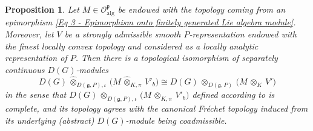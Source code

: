 \documentclass[a4paper, reqno, 10pt]{amsart}
\newtheorem{proposition}[theorem]{Proposition}
\theoremstyle{definition}
\numberwithin{equation}{section}
\newcommand{\botimes}[1]{{\,\otimes_{#1}\,}}
\newcommand{\cotimes}[1]{{\,\widehat{\otimes}_{#1}\,}}
\newcommand{\projotimes}{{\,\otimes_{K,\pi}\,}}
\newcommand{\projcotimes}{{\,\widehat{\otimes}_{K,\pi}\,}}
\newcommand{\CO}{{\mathcal {O}}}
\newcommand{\Fg}{{\mathfrak {g}}}
\newcommand{\Fp}{{\mathfrak {p}}}
\newcommand{\alg}{{\mathrm{alg}}}
\begin{document}
\begin{proposition}\label{Lemma 3 - Comparision between Orlik-Strauch functors and topological tensor product}
	Let $M \in \CO^\Fp_\alg$ be endowed with the topology coming from an epimorphism \eqref{Eq 3 - Epimorphism onto finitely generated Lie algebra module}.
	Moreover, let $V$ be a strongly admissible smooth $P$-representation endowed with the finest locally convex topology and considered as a locally analytic representation of $P$.
	Then there is a topological isomorphism of separately continuous $D(G)$-modules
	\begin{equation}\label{Eq 3 - Comparison between topologies of tensoring up functor}
		D(G) \cotimes{D(\Fg,P),\iota} \big(M \projcotimes V'_b \big) \cong D(G) \botimes{D(\Fg,P)} \big(M \botimes{K} V' \big)
	\end{equation}
	in the sense that $D(G) \botimes{D(\Fg,P),\iota} \big( M \projotimes V'_b \big)$ defined according to  is complete, and its topology agrees with the canonical Fr\'echet topology induced from its underlying (abstract) $D(G)$-module being coadmissible.
\end{proposition}
\end{document}
